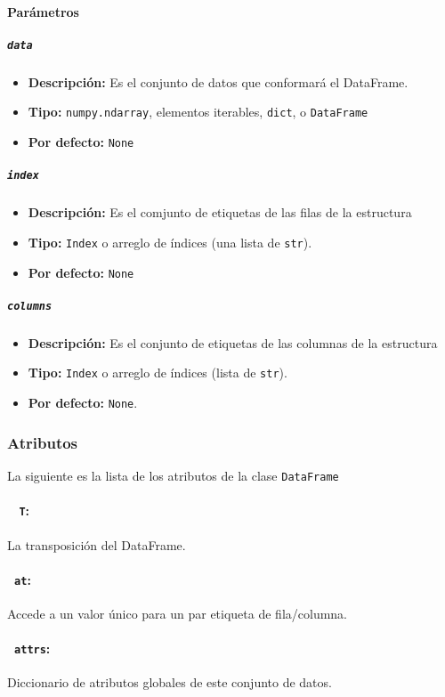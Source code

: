 \paragraph{Parámetros}
\subparagraph{\texttt{data}}
\begin{itemize}
\item \textbf{Descripción:} Es el conjunto de datos que conformará el DataFrame.
\item \textbf{Tipo:} \texttt{numpy.ndarray}, elementos iterables, \texttt{dict}, o \texttt{DataFrame}
\item \textbf{Por defecto:} \texttt{None}
\end{itemize}
\subparagraph{\texttt{index}}
\begin{itemize}
\item \textbf{Descripción:} Es el comjunto de etiquetas de las filas de la estructura
\item     \textbf{Tipo:} \texttt{Index} o arreglo de índices (una lista de \texttt{str}).
\item     \textbf{Por defecto:} \texttt{None}
\end{itemize}
\subparagraph{\texttt{columns}}
\begin{itemize}
\item \textbf{Descripción:} Es el conjunto de etiquetas de las columnas de la estructura
\item \textbf{Tipo:} \texttt{Index} o arreglo de índices (lista de \texttt{str}).
\item \textbf{Por defecto:} \texttt{None}.
\end{itemize}
\subsubsection{Atributos}
La siguiente es la lista de los atributos de la clase \texttt{DataFrame}
\paragraph{~\hspace{2em} \texttt{T}:} La transposición del DataFrame.
\paragraph{~\hspace{2em}\texttt{at}:} Accede a un valor único para un par etiqueta de fila/columna.
\paragraph{~\hspace{2em}\texttt{attrs}:} Diccionario de atributos globales de este conjunto de datos.
